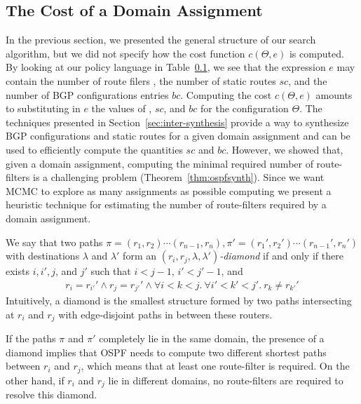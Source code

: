 \subsection{The Cost of a Domain Assignment}
In the previous section, we presented the general structure of our search algorithm,
but we did not specify how the cost function $c(\Theta,e)$
is computed. 
By looking at our policy language in Table~\ref{},
we see that the expression $e$ may contain
the number of route filers ,
the number of static routes $sc$,
and the number of BGP configurations entries $bc$.
Computing the cost $c(\Theta,e)$ amounts to substituting in $e$ the values of ,
$sc$, and $bc$ for the configuration $\Theta$.
The techniques presented in Section~\ref{sec:inter-synthesis} provide a way to 
synthesize BGP configurations and static routes for a given domain assignment
and can be used to 
efficiently compute the quantities $sc$ and $bc$.
However, we showed that, given a domain assignment, computing the  minimal required number of route-filters 
is a challenging problem (Theorem~\ref{thm:ospfsynth}).
Since we want MCMC to explore as many assignments as possible
computing 
we present a heuristic technique for estimating the number of route-filters required by a 
 domain assignment. 

We say that two paths $\pi=(r_1,r_2)\cdots (r_{n-1},r_n), \pi'=(r_1',r_2')\cdots (r_{n-1}',r_n')$ with destinations $\lambda$ and $\lambda'$
form an $(r_i, r_j, \lambda, \lambda')$\emph{-diamond} if and only if
there exists $i,i',j$, and $j'$ such that $i<j-1$, $i'<j'-1$, and
\begin{multline}
r_i{=}r_{i'}' \wedge  r_j{=}r_{j'}' \wedge  \forall i{<}k{<}j.~\forall i'{<}k'{<}j'.~r_{k}{\neq} r_{k'}'  
\end{multline}
Intuitively, a diamond is the smallest structure formed by two
paths intersecting at $r_i$ and $r_j$ with edge-disjoint paths in 
between these routers. 

If the paths $\pi$ and $\pi'$ completely lie in the same domain,
the presence of a diamond 
implies that OSPF needs to compute two different shortest paths between $r_i$ and $r_j$, 
which means that
at least one route-filter is required.
On the other hand, if $r_i$ and $r_j$ lie in
different domains, no route-filters are required to resolve this diamond. 

